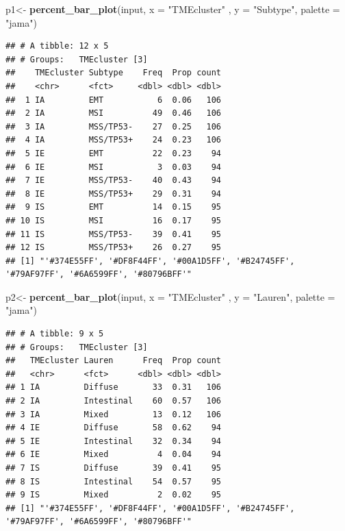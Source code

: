 \documentclass[
  12pt,
]{book}
\newenvironment{Shaded}{\begin{snugshade}}{\end{snugshade}}
\newcommand{\AttributeTok}[1]{\textcolor[rgb]{0.13,0.29,0.53}{#1}}
\newcommand{\FunctionTok}[1]{\textcolor[rgb]{0.13,0.29,0.53}{\textbf{#1}}}
\newcommand{\NormalTok}[1]{#1}
\newcommand{\OtherTok}[1]{\textcolor[rgb]{0.56,0.35,0.01}{#1}}
\newcommand{\StringTok}[1]{\textcolor[rgb]{0.31,0.60,0.02}{#1}}
\theoremstyle{definition}
\theoremstyle{definition}
\theoremstyle{definition}
\theoremstyle{definition}
\theoremstyle{remark}
\begin{document}
\begin{Shaded}
\begin{Highlighting}[]
\NormalTok{p1}\OtherTok{\textless{}{-}} \FunctionTok{percent\_bar\_plot}\NormalTok{(input, }\AttributeTok{x =} \StringTok{"TMEcluster"}\NormalTok{ , }\AttributeTok{y =} \StringTok{"Subtype"}\NormalTok{, }\AttributeTok{palette =} \StringTok{"jama"}\NormalTok{)}
\end{Highlighting}
\end{Shaded}

\begin{verbatim}
## # A tibble: 12 x 5
## # Groups:   TMEcluster [3]
##    TMEcluster Subtype    Freq  Prop count
##    <chr>      <fct>     <dbl> <dbl> <dbl>
##  1 IA         EMT           6  0.06   106
##  2 IA         MSI          49  0.46   106
##  3 IA         MSS/TP53-    27  0.25   106
##  4 IA         MSS/TP53+    24  0.23   106
##  5 IE         EMT          22  0.23    94
##  6 IE         MSI           3  0.03    94
##  7 IE         MSS/TP53-    40  0.43    94
##  8 IE         MSS/TP53+    29  0.31    94
##  9 IS         EMT          14  0.15    95
## 10 IS         MSI          16  0.17    95
## 11 IS         MSS/TP53-    39  0.41    95
## 12 IS         MSS/TP53+    26  0.27    95
## [1] "'#374E55FF', '#DF8F44FF', '#00A1D5FF', '#B24745FF', '#79AF97FF', '#6A6599FF', '#80796BFF'"
\end{verbatim}

\begin{Shaded}
\begin{Highlighting}[]
\NormalTok{p2}\OtherTok{\textless{}{-}} \FunctionTok{percent\_bar\_plot}\NormalTok{(input, }\AttributeTok{x =} \StringTok{"TMEcluster"}\NormalTok{ , }\AttributeTok{y =} \StringTok{"Lauren"}\NormalTok{, }\AttributeTok{palette =} \StringTok{"jama"}\NormalTok{)}
\end{Highlighting}
\end{Shaded}

\begin{verbatim}
## # A tibble: 9 x 5
## # Groups:   TMEcluster [3]
##   TMEcluster Lauren      Freq  Prop count
##   <chr>      <fct>      <dbl> <dbl> <dbl>
## 1 IA         Diffuse       33  0.31   106
## 2 IA         Intestinal    60  0.57   106
## 3 IA         Mixed         13  0.12   106
## 4 IE         Diffuse       58  0.62    94
## 5 IE         Intestinal    32  0.34    94
## 6 IE         Mixed          4  0.04    94
## 7 IS         Diffuse       39  0.41    95
## 8 IS         Intestinal    54  0.57    95
## 9 IS         Mixed          2  0.02    95
## [1] "'#374E55FF', '#DF8F44FF', '#00A1D5FF', '#B24745FF', '#79AF97FF', '#6A6599FF', '#80796BFF'"
\end{verbatim}
\end{document}
